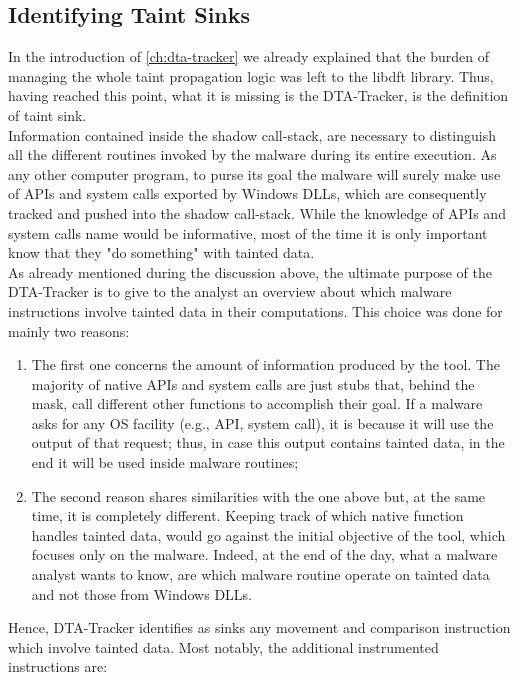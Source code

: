 \documentclass[LaM,binding=0.6cm]{sapthesis}
\begin{document}
\subsection{Identifying Taint Sinks}
\label{subsec:taintsinks}
In the introduction of \autoref{ch:dta-tracker} we already explained that the burden of managing the whole taint propagation logic was left to the libdft library. Thus, having reached this point, what it is missing is the DTA-Tracker, is the definition of taint sink.\\

Information contained inside the shadow call-stack, are necessary to distinguish all the different routines invoked by the malware during its entire execution. As any other computer program, to purse its goal the malware will surely make use of APIs and system calls exported by Windows DLLs, which are consequently tracked and pushed into the shadow call-stack. While the knowledge of APIs and system calls name would be informative, most of the time it is only important know that they "do something" with tainted data.\\
As already mentioned during the discussion above, the ultimate purpose of the DTA-Tracker is to give to the analyst an overview about which malware instructions involve tainted data in their computations. This choice was done for mainly two reasons:
\begin{enumerate}
\item The first one concerns the amount of information produced by the tool. The majority of native APIs and system calls are just stubs that, behind the mask, call different other functions to accomplish their goal. If a malware asks for any OS facility (e.g., API, system call), it is because it will use the output of that request; thus, in case this output contains tainted data, in the end it will be used inside malware routines;
\item The second reason shares similarities with the one above but, at the same time, it is completely different. Keeping track of which native function handles tainted data, would go against the initial objective of the tool, which focuses only on the malware. Indeed, at the end of the day, what a malware analyst wants to know, are which malware routine operate on tainted data and not those from Windows DLLs.
\end{enumerate}
Hence, DTA-Tracker identifies as sinks any movement and comparison instruction which involve tainted data. Most notably, the additional instrumented instructions are:
\end{document}
